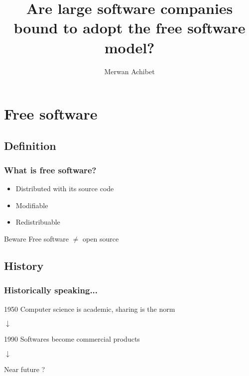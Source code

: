 \documentclass{beamer}
\title{Are large software companies bound to adopt the free software
  model?}
\author{Merwan Achibet}
\begin{document}
\maketitle

\section{Free software}

\subsection{Definition}

\begin{frame}

  \frametitle{What is free software?}

  \begin{itemize}
    \item{Distributed with its source code}
    \item{Modifiable}
    \item{Redistribuable}
  \end{itemize}

  \begin{block}{Beware}
    Free software $\neq$ open source
  \end{block}

\end{frame}

\subsection{History}

\begin{frame}

  \frametitle{Historically speaking...}

  \begin{block}{1950}
    Computer science is academic, sharing is the norm
  \end{block}

  $\downarrow$

  \begin{block}{1990}
    Softwares become commercial products
  \end{block}

  $\downarrow$

  \begin{block}{Near future}
    ?
  \end{block}

\end{frame}
\end{document}
